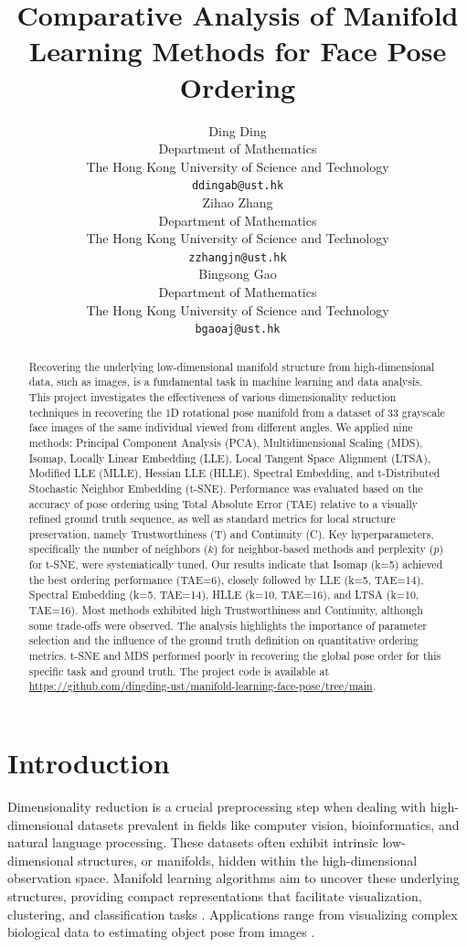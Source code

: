 \documentclass{article}
\title{Comparative Analysis of Manifold Learning Methods for Face Pose Ordering}
\author{%
  Ding Ding \\
  Department of Mathematics\\
  The Hong Kong University of Science and Technology\\
  \texttt{ddingab@ust.hk} \\
  \And
  Zihao Zhang \\
  Department of Mathematics\\
  The Hong Kong University of Science and Technology\\
  \texttt{zzhangjn@ust.hk} \\
  \And
  Bingsong Gao \\
  Department of Mathematics\\
  The Hong Kong University of Science and Technology\\
  \texttt{bgaoaj@ust.hk} \\
}
\begin{document}
\maketitle

\begin{abstract}
  Recovering the underlying low-dimensional manifold structure from high-dimensional data, such as images, is a fundamental task in machine learning and data analysis. This project investigates the effectiveness of various dimensionality reduction techniques in recovering the 1D rotational pose manifold from a dataset of 33 grayscale face images of the same individual viewed from different angles. We applied nine methods: Principal Component Analysis (PCA), Multidimensional Scaling (MDS), Isomap, Locally Linear Embedding (LLE), Local Tangent Space Alignment (LTSA), Modified LLE (MLLE), Hessian LLE (HLLE), Spectral Embedding, and t-Distributed Stochastic Neighbor Embedding (t-SNE). Performance was evaluated based on the accuracy of pose ordering using Total Absolute Error (TAE) relative to a visually refined ground truth sequence, as well as standard metrics for local structure preservation, namely Trustworthiness (T) and Continuity (C). Key hyperparameters, specifically the number of neighbors ($k$) for neighbor-based methods and perplexity ($p$) for t-SNE, were systematically tuned. Our results indicate that Isomap (k=5) achieved the best ordering performance (TAE=6), closely followed by LLE (k=5, TAE=14), Spectral Embedding (k=5, TAE=14), HLLE (k=10, TAE=16), and LTSA (k=10, TAE=16). Most methods exhibited high Trustworthiness and Continuity, although some trade-offs were observed. The analysis highlights the importance of parameter selection and the influence of the ground truth definition on quantitative ordering metrics. t-SNE and MDS performed poorly in recovering the global pose order for this specific task and ground truth. The project code is available at \url{https://github.com/dingding-ust/manifold-learning-face-pose/tree/main}.
\end{abstract}

\section{Introduction}
\label{sec:intro}

Dimensionality reduction is a crucial preprocessing step when dealing with high-dimensional datasets prevalent in fields like computer vision, bioinformatics, and natural language processing. These datasets often exhibit intrinsic low-dimensional structures, or manifolds, hidden within the high-dimensional observation space. Manifold learning algorithms aim to uncover these underlying structures, providing compact representations that facilitate visualization, clustering, and classification tasks \citep{vanDerMaaten2009}. Applications range from visualizing complex biological data to estimating object pose from images \citep{Tenenbaum2000, Roweis2000}.
\end{document}
